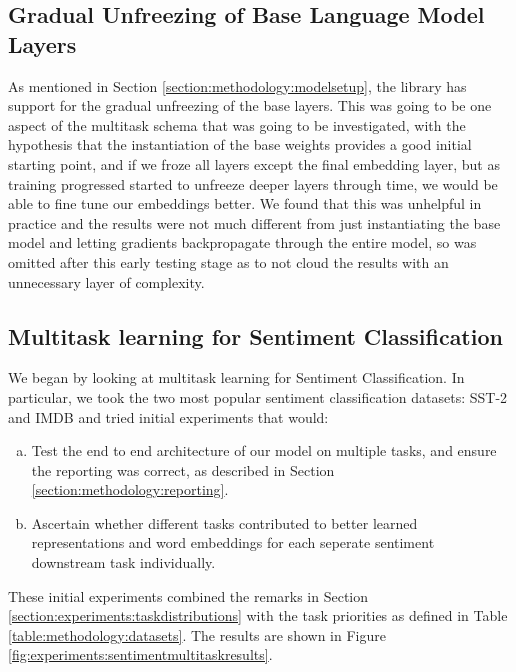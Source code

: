 \subsection{Gradual Unfreezing of Base Language Model Layers} \label{section:experiments:unfreezing}
As mentioned in Section \ref{section:methodology:modelsetup}, the library has support for the gradual unfreezing of the base layers. This was going to be one aspect of the multitask schema that was going to be investigated, with the hypothesis that the instantiation of the base weights provides a good initial starting point, and if we froze all layers except the final embedding layer, but as training progressed started to unfreeze deeper layers through time, we would be able to fine tune our embeddings better. We found that this was unhelpful in practice and the results were not much different from just instantiating the base model and letting gradients backpropagate through the entire model, so was omitted after this early testing stage as to not cloud the results with an unnecessary layer of complexity.

\subsection{Multitask learning for Sentiment Classification} \label{section:experiments:sentimentonly}
We began by looking at multitask learning for Sentiment Classification. In particular, we took the two most popular sentiment classification datasets: SST-2 and IMDB and tried initial experiments that would:
\begin{enumerate}[a.]
	\item Test the end to end architecture of our model on multiple tasks, and ensure the reporting was correct, as described in Section \ref{section:methodology:reporting}.
	\item Ascertain whether different tasks contributed to better learned representations and word embeddings for each seperate sentiment downstream task individually.
\end{enumerate}

These initial experiments combined the remarks in Section \ref{section:experiments:taskdistributions} with the task priorities as defined in Table \ref{table:methodology:datasets}. The results are shown in Figure \ref{fig:experiments:sentimentmultitaskresults}.

